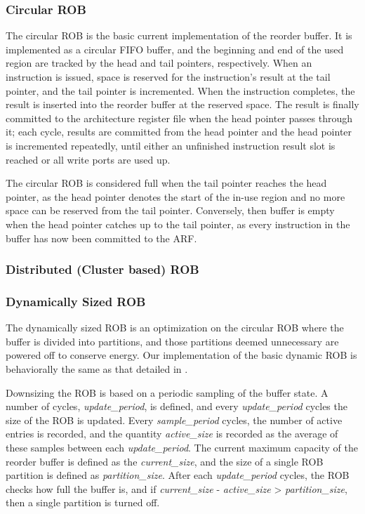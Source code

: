 \documentclass{acm_proc_article-sp}
\begin{document}
\subsubsection{Circular ROB}
\label{sec:circ}
The circular ROB is the basic current implementation of the reorder buffer. It is implemented as a circular FIFO buffer, and the beginning and end of the used region are tracked by the head and tail pointers, respectively. When an instruction is issued, space is reserved for the instruction's result at the tail pointer, and the tail pointer is incremented. When the instruction completes, the result is inserted into the reorder buffer at the reserved space. The result is finally committed to the architecture register file when the head pointer passes through it; each cycle, results are committed from the head pointer and the head pointer is incremented repeatedly, until either an unfinished instruction result slot is reached or all write ports are used up.

The circular ROB is considered full when the tail pointer reaches the head pointer, as the head pointer denotes the start of the in-use region and no more space can be reserved from the tail pointer. Conversely, then buffer is empty when the head pointer catches up to the tail pointer, as every instruction in the buffer has now been committed to the ARF.

\subsubsection{Distributed (Cluster based) ROB}



\subsubsection{Dynamically Sized ROB}
The dynamically sized ROB is an optimization on the circular ROB where the buffer is divided into partitions, and those partitions deemed unnecessary are powered off to conserve energy. Our implementation of the basic dynamic ROB is behaviorally the same as that detailed in \cite{kucuk2}.

Downsizing the ROB is based on a periodic sampling of the buffer state. A number of cycles, {\it update\_period}, is defined, and every {\it update\_period} cycles the size of the ROB is updated. Every {\it sample\_period} cycles, the number of active entries is recorded, and the quantity {\it active\_size} is recorded as the average of these samples between each {\it update\_period}. The current maximum capacity of the reorder buffer is defined as the {\it current\_size}, and the size of a single ROB partition is defined as {\it partition\_size}. After each {\it update\_period} cycles, the ROB checks how full the buffer is, and if {\it current\_size} - {\it active\_size} > {\it partition\_size}, then a single partition is turned off.
\end{document}

